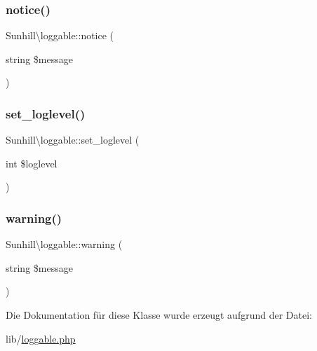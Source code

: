 \subsubsection{\texorpdfstring{notice()}{notice()}}
{\footnotesize\ttfamily Sunhill\textbackslash{}loggable\+::notice (\begin{DoxyParamCaption}\item[{string}]{\$message }\end{DoxyParamCaption})\hspace{0.3cm}{\ttfamily [protected]}}

\mbox{\label{classSunhill_1_1loggable_ab0b6023936fae376edba6cea489e6669}} 
\subsubsection{\texorpdfstring{set\+\_\+loglevel()}{set\_loglevel()}}
{\footnotesize\ttfamily Sunhill\textbackslash{}loggable\+::set\+\_\+loglevel (\begin{DoxyParamCaption}\item[{int}]{\$loglevel }\end{DoxyParamCaption})}

\mbox{\label{classSunhill_1_1loggable_aadafede5632bc9836099dec3f70ce88a}} 
\subsubsection{\texorpdfstring{warning()}{warning()}}
{\footnotesize\ttfamily Sunhill\textbackslash{}loggable\+::warning (\begin{DoxyParamCaption}\item[{string}]{\$message }\end{DoxyParamCaption})\hspace{0.3cm}{\ttfamily [protected]}}



Die Dokumentation für diese Klasse wurde erzeugt aufgrund der Datei\+:\begin{DoxyCompactItemize}
\item 
lib/\hyperlink{loggable_8php}{loggable.\+php}\end{DoxyCompactItemize}
